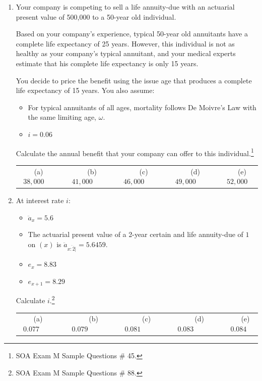 \documentclass[11pt,fleqn,oneside]{book}
\begin{document}
\begin{enumerate}
\item Your company is competing to sell a life annuity-due with an actuarial present value of
500,000 to a 50-year old individual.

Based on your company's experience, typical 50-year old annuitants have a complete life expectancy of 25 years. However, this individual is not as healthy as your company's
typical annuitant, and your medical experts estimate that his complete life expectancy is
only 15 years.

You decide to price the benefit using the issue age that produces a complete life expectancy of 15 years. You also assume:
\begin{itemize}
\item For typical annuitants of all ages, mortality follows De Moivre's Law with the
same limiting age, $\omega$.
\item $i = 0.06$
\end{itemize}
Calculate the annual benefit that your company can offer to this individual.\footnote[5]{SOA Exam M Sample Questions \# 45.}

\begin{center}
\small
\begin{tabular}{c c c c c}
(a) $38,000\;\;\;\;\;$ & 
$\;\;\;\;\;$(b) $41,000\;\;\;\;\;$ &
$\;\;\;\;\;$(c) $46,000\;\;\;\;\;$ & 
$\;\;\;\;\;$(d) $49,000\;\;\;\;\;$ &
$\;\;\;\;\;$(e) $52,000$
\end{tabular}
\end{center}
\normalsize

\item At interest rate $i$:
\begin{itemize}
\item $\ddot{a}_x = 5.6$
\item The actuarial present value of a 2-year certain and life annuity-due of $1$ on $(x)$ is 
$\ddot{a}_{\overline{x:\overline{2}|}}=5.6459$.
\item $e_x = 8.83$
\item $e_{x+1}=8.29$
\end{itemize} 
Calculate $i$.\footnote[6]{SOA Exam M Sample Questions \# 88.}

\begin{center}
\small
\begin{tabular}{c c c c c}
(a) $0.077\;\;\;\;\;\;\;$ & 
$\;\;\;\;\;\;\;$(b) $0.079\;\;\;\;\;\;\;$ &
$\;\;\;\;\;\;\;$(c) $0.081\;\;\;\;\;\;\;$ & 
$\;\;\;\;\;\;\;$(d) $0.083\;\;\;\;\;\;\;$ &
$\;\;\;\;\;\;\;$(e) $0.084$
\end{tabular}
\end{center}
\normalsize
\end{enumerate}
\end{document}
